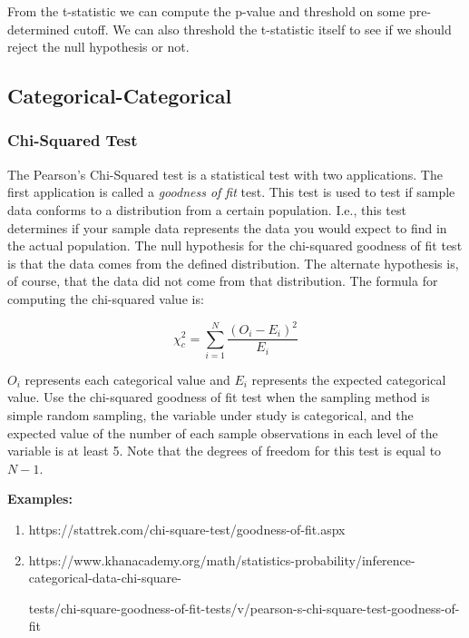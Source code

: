 \documentclass{article}
\begin{document}
\noindent
From the t-statistic we can compute the p-value and threshold on some pre-determined cutoff. We can also threshold the t-statistic itself to see if we should reject the null hypothesis or not. 



\subsection{Categorical-Categorical}
\subsubsection*{Chi-Squared Test}
The Pearson's Chi-Squared test is a statistical test with two applications. The first application is called a \textit{goodness of fit} test. This test is used to test if sample data conforms to a distribution from a certain population. I.e., this test determines if your sample data represents the data you would expect to find in the actual population. The null hypothesis for the chi-squared goodness of fit test is that the data comes from the defined distribution. The alternate hypothesis is, of course, that the data did not come from that distribution. The formula for computing the chi-squared value is:

\[\chi^2_c = \sum_{i=1}^N\frac{(O_i - E_i)^2}{E_i}\]

\noindent
$O_i$ represents each categorical value and $E_i$ represents the expected categorical value. Use the chi-squared goodness of fit test when the sampling method is simple random sampling, the variable under study is categorical, and the expected value of the number of each sample observations in each level of the variable is at least 5. Note that the degrees of freedom for this test is equal to $N - 1$. 

\vspace{3mm}
\textbf{Examples:}
\begin{enumerate}
\item
https://stattrek.com/chi-square-test/goodness-of-fit.aspx
\item
https://www.khanacademy.org/math/statistics-probability/inference-categorical-data-chi-square-

tests/chi-square-goodness-of-fit-tests/v/pearson-s-chi-square-test-goodness-of-fit


\end{enumerate}
\end{document}
